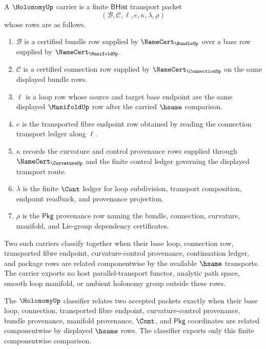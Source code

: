\begin{definition}
\label{def:holonomy-bhist-transport-carrier}
A $\HolonomyUp$ carrier is a finite $\mathsf{BHist}$ transport packet
$$
(\mathcal B,\mathcal C,\ell,e,\kappa,\lambda,\rho)
$$
whose rows are as follows.
\begin{enumerate}
\item $\mathcal B$ is a certified bundle row supplied by $\NameCert_{\BundleUp}$ over a base row supplied by $\NameCert_{\ManifoldUp}$.
\item $\mathcal C$ is a certified connection row supplied by $\NameCert_{\ConnectionUp}$ on the same displayed bundle rows.
\item $\ell$ is a loop row whose source and target base endpoint are the same displayed $\ManifoldUp$ row after the carried $\hsame$ comparison.
\item $e$ is the transported fibre endpoint row obtained by reading the connection transport ledger along $\ell$.
\item $\kappa$ records the curvature and control provenance rows supplied through $\NameCert_{\CurvatureUp}$ and the finite control ledger governing the displayed transport route.
\item $\lambda$ is the finite $\Cont$ ledger for loop subdivision, transport composition, endpoint readback, and provenance projection.
\item $\rho$ is the $\mathsf{Pkg}$ provenance row naming the bundle, connection, curvature, manifold, and Lie-group dependency certificates.
\end{enumerate}
Two such carriers classify together when their base loop, connection row, transported fibre endpoint, curvature-control provenance, continuation ledger, and package rows are related componentwise by the available $\hsame$ transports. The carrier exports no host parallel-transport functor, analytic path space, smooth loop manifold, or ambient holonomy group outside these rows.
\end{definition}

\begin{definition}
\label{def:holonomy-finite-transport-classifier}
The $\HolonomyUp$ classifier relates two accepted packets exactly when their base loop, connection, transported fibre endpoint, curvature-control provenance, bundle provenance, manifold provenance, $\Cont$, and $\mathsf{Pkg}$ coordinates are related componentwise by displayed $\hsame$ rows. The classifier exports only this finite componentwise comparison.
\end{definition}

